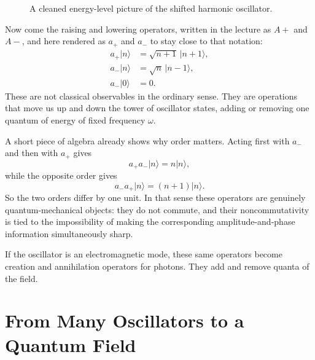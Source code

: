 \begin{figure}[t]
\centering
{}
\caption{A cleaned energy-level picture of the shifted harmonic oscillator.}
\end{figure}

Now come the raising and lowering operators, written in the lecture as \(A+\) and \(A-\), and here rendered as \(a_+\) and \(a_-\) to stay close to that notation:
\begin{align}
a_+|n\rangle &= \sqrt{n+1}\,|n+1\rangle,\\
a_-|n\rangle &= \sqrt{n}\,|n-1\rangle,\\
a_-|0\rangle &= 0.
\end{align}
These are not classical observables in the ordinary sense. They are operations that move us up and down the tower of oscillator states, adding or removing one quantum of energy of fixed frequency \(\omega\).

A short piece of algebra already shows why order matters. Acting first with \(a_-\) and then with \(a_+\) gives
\begin{equation}
a_+a_-|n\rangle = n|n\rangle,
\end{equation}
while the opposite order gives
\begin{equation}
a_-a_+|n\rangle = (n+1)|n\rangle.
\end{equation}
So the two orders differ by one unit. In that sense these operators are genuinely quantum-mechanical objects: they do not commute, and their noncommutativity is tied to the impossibility of making the corresponding amplitude-and-phase information simultaneously sharp.

If the oscillator is an electromagnetic mode, these same operators become creation and annihilation operators for photons. They add and remove quanta of the field.

\section{From Many Oscillators to a Quantum Field}

